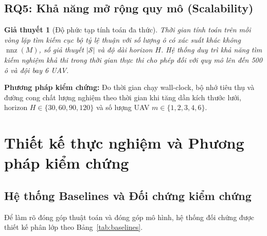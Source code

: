\documentclass[12pt,a4paper]{article}
\newtheorem{hypothesis}{Giả thuyết}
\begin{document}
\subsection{RQ5: Khả năng mở rộng quy mô (Scalability)}

\begin{hypothesis}[Độ phức tạp tính toán đa thức]
Thời gian tính toán trên mỗi vòng lặp tìm kiếm cục bộ tỷ lệ thuận với số lượng ô có xác suất khác không $\operatorname{nnz}(M)$, số giả thuyết $|\mathcal{S}|$ và độ dài horizon $H$. Hệ thống duy trì khả năng tìm kiếm nghiệm khả thi trong thời gian thực thi cho phép đối với quy mô lên đến 500 ô và đội bay 6 UAV.
\end{hypothesis}

\textbf{Phương pháp kiểm chứng:} Đo thời gian chạy wall-clock, bộ nhớ tiêu thụ và đường cong chất lượng nghiệm theo thời gian khi tăng dần kích thước lưới, horizon $H \in \{30, 60, 90, 120\}$ và số lượng UAV $m \in \{1, 2, 3, 4, 6\}$.

\section{Thiết kế thực nghiệm và Phương pháp kiểm chứng}

\subsection{Hệ thống Baselines và Đối chứng kiểm chứng}

Để làm rõ đóng góp thuật toán và đóng góp mô hình, hệ thống đối chứng được thiết kế phân lớp theo Bảng~\ref{tab:baselines}.
\end{document}
